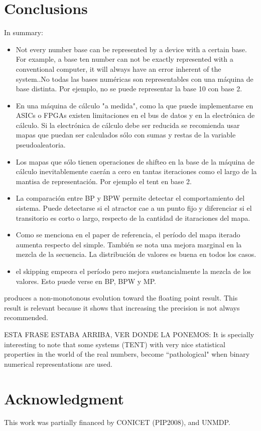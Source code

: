 \section{Conclusions}\label{sec:conclusions}
In summary:
\begin{itemize}
  \item Not every number base can be represented by a device with a certain base. For example, a base ten number can not be exactly represented with a conventional computer, it will always have an error inherent of the system..No todas las bases numéricas son representables con una máquina de base distinta. Por ejemplo, no se puede representar la base 10 con base 2.
  \item En una máquina de cálculo "a medida", como la que puede implementarse en ASICs o FPGAs existen limitaciones en el bus de datos y en la electrónica de cálculo. Si la electrónica de cálculo debe ser reducida se recomienda usar mapas que puedan ser calculados sólo con sumas y restas de la variable pseudoaleatoria.
  \item Los mapas que sólo tienen operaciones de shifteo en la base de la máquina de cálculo inevitablemente caerán a cero en tantas iteraciones como el largo de la mantisa de representación. Por ejemplo el tent en base 2.
  \item La comparación entre BP y BPW permite detectar el comportamiento del sistema. Puede detectarse si el atractor cae a un punto fijo y diferenciar si el transitorio es corto o largo, respecto de la cantidad de itaraciones del mapa.
  \item Como se menciona en el paper de referencia, el período del mapa iterado aumenta respecto del simple. También se nota una mejora marginal en la mezcla de la secuencia. La distribución de valores es buena en todos los casos.
  \item el skipping empeora el período pero mejora sustancialmente la mezcla de los valores. Esto puede verse en BP, BPW y MP.
\end{itemize}

produces a non-monotonous evolution toward the floating point result. This result is relevant because it shows that increasing the precision is not
always recommended.

ESTA FRASE ESTABA ARRIBA, VER DONDE LA PONEMOS: It is specially interesting to note that some systems (TENT) with very nice statistical properties in the world of the real numbers, become ``pathological" when binary numerical representations are used.

\section*{Acknowledgment}
This work was partially financed by CONICET (PIP2008),  and UNMDP.
